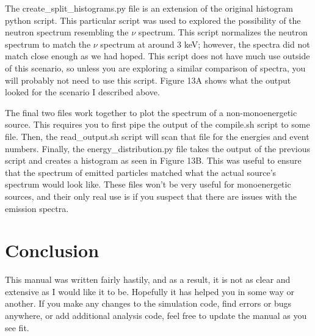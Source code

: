 \documentclass[%
12pt,
twoside,
reprint,
amsmath,amssymb,
aps,
]{article}
\begin{document}
	\par The create\_split\_histograms.py file is an extension of the original histogram python script. This particular script was used to explored the possibility of the neutron spectrum resembling the $\nu$ spectrum. This script normalizes the neutron spectrum to match the $\nu$ spectrum at around 3 keV; however, the spectra did not match close enough as we had hoped. This script does not have much use outside of this scenario, so unless you are exploring a similar comparison of spectra, you will probably not need to use this script. Figure 13A shows what the output looked for the scenario I described above.
	\par The final two files work together to plot the spectrum of a non-monoenergetic source. This requires you to first pipe the output of the compile.sh script to some file. Then, the read\_output.sh script will scan that file for the energies and event numbers. Finally, the energy\_distribution.py file takes the output of the previous script and creates a histogram as seen in Figure 13B. This was useful to ensure that the spectrum of emitted particles matched what the actual source's spectrum would look like. These files won't be very useful for monoenergetic sources, and their only real use is if you suspect that there are issues with the emission spectra.
	
	\section{Conclusion}
	\par This manual was written fairly hastily, and as a result, it is not as clear and extensive as I would like it to be. Hopefully it has helped you in some way or another. If you make any changes to the simulation code, find errors or bugs anywhere, or add additional analysis code, feel free to update the manual as you see fit.
\end{document}
